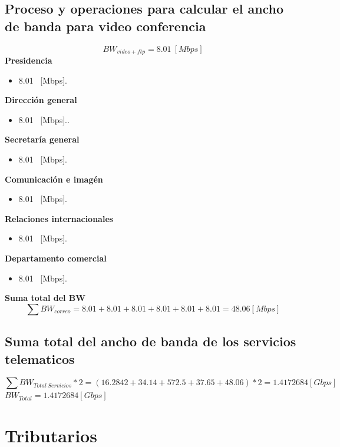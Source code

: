 \documentclass[12pt,letterpaper]{article}
\begin{document}
\subsection{Proceso y operaciones para calcular el ancho de banda para video conferencia}
\begin{equation}
    BW_{video+ftp}=8.01 \ [Mbps]
\end{equation}
\textbf{Presidencia}
\begin{itemize}
    \item 8.01 \ [Mbps].
\end{itemize}
\textbf{Dirección general}
\begin{itemize}
    \item 8.01 \ [Mbps]..
\end{itemize}
\textbf{Secretaría general}
\begin{itemize}
    \item 8.01 \ [Mbps].
\end{itemize}
\textbf{Comunicación e imagén}
\begin{itemize}
    \item 8.01 \ [Mbps].
\end{itemize}
\textbf{Relaciones internacionales}
\begin{itemize}
    \item 8.01 \ [Mbps].
\end{itemize}
\textbf{Departamento comercial}
\begin{itemize}
    \item 8.01 \ [Mbps].
\end{itemize}
\textbf{Suma total del BW}
\begin{equation}
    \sum BW_{correo}=8.01+8.01+8.01+8.01+8.01+8.01=48.06[Mbps]
\end{equation}

\subsection{Suma total del ancho de banda de los servicios telematicos}
\begin{equation}
    \sum BW_{Total \ Servicios}*2=(16.2842+34.14+572.5+37.65+48.06)*2=1.4172684[Gbps]
\end{equation}
\newline
$BW_{Total}=1.4172684[Gbps]$


\newpage
\section{Tributarios}
\end{document}
